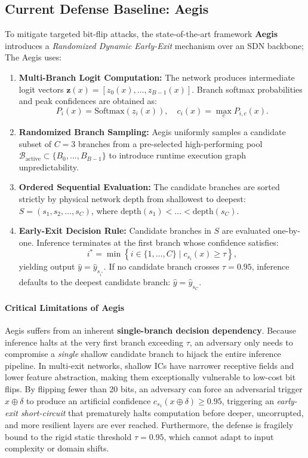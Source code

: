 \documentclass[conference,10pt]{IEEEtran}
\begin{document}
\subsection{Current Defense Baseline: Aegis}
To mitigate targeted bit-flip attacks, the state-of-the-art framework \textbf{Aegis}~\cite{wang2023aegis} introduces a \textit{Randomized Dynamic Early-Exit} mechanism over an SDN backbone; The Aegis uses:
\begin{enumerate}
    \item \textbf{Multi-Branch Logit Computation:} The network produces intermediate logit vectors $\mathbf{z}(x) = [z_0(x), \dots, z_{B-1}(x)]$. Branch softmax probabilities and peak confidences are obtained as:
    \begin{equation}
        P_i(x) = \text{Softmax}(z_i(x)), \quad c_i(x) = \max_{c} P_{i, c}(x).
    \end{equation}
    \item \textbf{Randomized Branch Sampling:} Aegis uniformly samples a candidate subset of $C = 3$ branches from a pre-selected high-performing pool $\mathcal{B}_{\text{active}} \subset \{B_0, \dots, B_{B-1}\}$ to introduce runtime execution graph unpredictability.
    \item \textbf{Ordered Sequential Evaluation:} The candidate branches are sorted strictly by physical network depth from shallowest to deepest: $S = (s_1, s_2, \dots, s_C)$, where $\text{depth}(s_1) < \dots < \text{depth}(s_C)$.
    \item \textbf{Early-Exit Decision Rule:} Candidate branches in $S$ are evaluated one-by-one. Inference terminates at the first branch whose confidence satisfies:
    \begin{equation}
        i^* = \min \left\{ i \in \{1, \dots, C\} \mid c_{s_i}(x) \ge \tau \right\},
    \end{equation}
    yielding output $\hat{y} = \hat{y}_{s_{i^*}}$. If no candidate branch crosses $\tau = 0.95$, inference defaults to the deepest candidate branch: $\hat{y} = \hat{y}_{s_C}$.
\end{enumerate}

\paragraph{Critical Limitations of Aegis}
Aegis suffers from an inherent \textbf{single-branch decision dependency}. Because inference halts at the very first branch exceeding $\tau$, an adversary only needs to compromise a \textit{single} shallow candidate branch to hijack the entire inference pipeline. In multi-exit networks, shallow ICs have narrower receptive fields and lower feature abstraction, making them exceptionally vulnerable to low-cost bit flips. By flipping fewer than 20 bits, an adversary can force an adversarial trigger $x \oplus \delta$ to produce an artificial confidence $c_{s_1}(x \oplus \delta) \ge 0.95$, triggering an \textit{early-exit short-circuit} that prematurely halts computation before deeper, uncorrupted, and more resilient layers are ever reached. Furthermore, the defense is fragilely bound to the rigid static threshold $\tau = 0.95$, which cannot adapt to input complexity or domain shifts.
\end{document}
